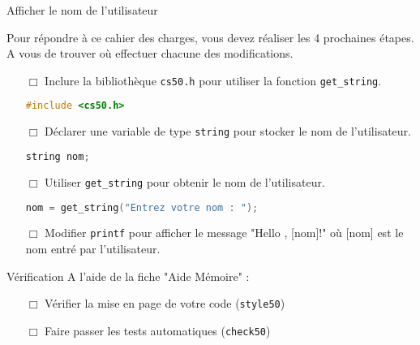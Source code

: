 \begin{UPSTIManipulation}{Afficher le nom de l'utilisateur}

	Pour répondre à ce cahier des charges, vous devez réaliser les 4 prochaines étapes. A vous de trouver où effectuer chacune des modifications.
	\begin{itemize}
		\item[$\Box$] Inclure la bibliothèque \texttt{cs50.h} pour utiliser la fonction \texttt{get\_string}.
		      \begin{lstlisting}[language=c]
	#include <cs50.h>
\end{lstlisting}
		\item[$\Box$] Déclarer une variable de type \texttt{string} pour stocker le nom de l'utilisateur.
		      \begin{lstlisting}[language=c]
	string nom;
\end{lstlisting}
		\item[$\Box$] Utiliser \texttt{get\_string} pour obtenir le nom de l'utilisateur.
		      \begin{lstlisting}[language=c]
	nom = get_string("Entrez votre nom : ");
\end{lstlisting}
		\item[$\Box$] Modifier \texttt{printf} pour afficher le message "Hello , [nom]!" où [nom] est le nom entré par l'utilisateur.
	\end{itemize}
\end{UPSTIManipulation}


\begin{UPSTIManipulation}{Vérification}
	A l'aide de la fiche "Aide Mémoire" :
	\begin{itemize}
		\item[$\Box$] Vérifier la mise en page de votre code (\texttt{style50})
		\item[$\Box$] Faire passer les tests automatiques (\texttt{check50})
	\end{itemize}
\end{UPSTIManipulation}



